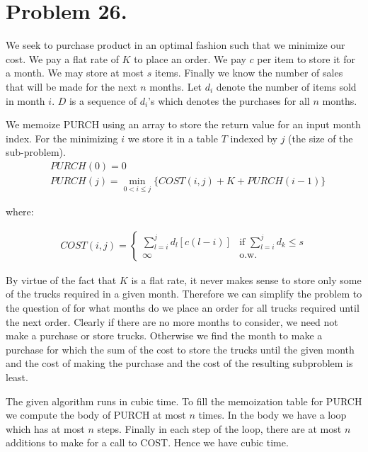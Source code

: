 \documentclass{amsart}
\theoremstyle{definition}
\theoremstyle{remark}
\numberwithin{equation}{section}
\begin{document}
\section{Problem 26.}
We seek to purchase product in an optimal fashion such that we minimize our cost. We pay a flat rate of $K$ to place an order. We pay $c$ per item to store it for a month. We may store at most $s$ items. Finally we know the number of sales that will be made for the next $n$ months. Let $d_i$ denote the number of items sold in month $i$. $D$ is a sequence of $d_i$'s which denotes the purchases for all $n$ months.

We memoize PURCH using an array to store the return value for an input month index. For the minimizing $i$ we store it in a table $T$ indexed by $j$ (the size of the sub-problem).
\algstar
\begin{align*}
  & PURCH(0) = 0 \\ 
  & PURCH(j) =
    \min_{0<i \leq j} \{ COST(i,j) + K + PURCH(i-1) \} 
\end{align*}

where:

\begin{align*}
  COST(i,j) = 
    \begin{cases}
      \displaystyle\sum_{l=i}^j d_l [c(l-i)] & \mbox{if } \displaystyle\sum_{l=i}^j d_k \leq s \\
      \infty & \mbox{o.w.}
    \end{cases}
\end{align*}

By virtue of the fact that $K$ is a flat rate, it never makes sense to store only some of the trucks required in a given month. Therefore we can simplify the problem to the question of for what months do we place an order for all trucks required until the next order. Clearly if there are no more months to consider, we need not make a purchase or store trucks. Otherwise we find the month to make a purchase for which the sum of the cost to store the trucks until the given month and the cost of making the purchase and the cost of the resulting subproblem is least.

\claimstar The given algorithm runs in cubic time.
To fill the memoization table for PURCH we compute the body of PURCH at most $n$ times. In the body we have a loop which has at most $n$ steps. Finally in each step of the loop, there are at most $n$ additions to make for a call to COST. Hence we have cubic time.
\end{document}
